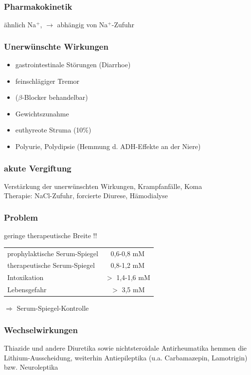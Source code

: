 \documentclass[10pt,a4paper]{report}
\begin{document}
\subsubsection{Pharmakokinetik} %
\label{ssub:pharmakokinetik}
ähnlich Na$^+$,	$\rightarrow$ abhängig von Na$^+$-Zufuhr
\subsubsection{Unerwünschte Wirkungen} %
\label{ssub:unerw_nschte_wirkungen}
\begin{itemize}
	\item gastrointestinale Störungen (Diarrhoe)
	\item feinschlägiger Tremor 
	\item ($\beta$-Blocker behandelbar)
	\item Gewichtszunahme
	\item euthyreote Struma (10\%)
	\item Polyurie, Polydipsie (Hemmung d. ADH-Effekte an der Niere)
\end{itemize}
\subsubsection{akute Vergiftung} %
\label{ssub:akute_vergiftung}
Verstärkung der unerwünschten Wirkungen, Krampfanfälle, Koma \\
Therapie: NaCl-Zufuhr, forcierte Diurese, Hämodialyse
\subsubsection{Problem} %
\label{ssub:problem}
geringe therapeutische Breite !!\\
\begin{tabularx}{\textwidth}{lc}
prophylaktische Serum-Spiegel&0,6-0,8 mM\\
therapeutische Serum-Spiegel&0,8-1,2 mM\\
Intoxikation&$>$ 1,4-1,6 mM\\
Lebensgefahr&$>$ 3,5 mM\\
\end{tabularx}
$\Rightarrow$ Serum-Spiegel-Kontrolle
\subsubsection{Wechselwirkungen} %
\label{ssub:wechselwirkungen}
Thiazide und andere Diuretika sowie nichtsteroidale Antirheumatika hemmen die Lithium-Ausscheidung, weiterhin Antiepileptika (u.a. Carbamazepin, Lamotrigin) bzw. Neuroleptika 
\end{document}
